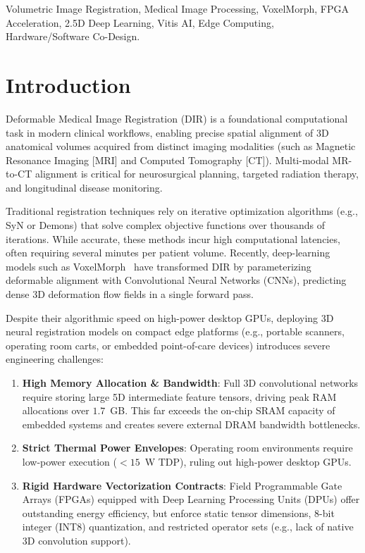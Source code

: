 \documentclass[conference]{IEEEtran}
\begin{document}
\begin{IEEEkeywords}
Volumetric Image Registration, Medical Image Processing, VoxelMorph, FPGA Acceleration, 2.5D Deep Learning, Vitis AI, Edge Computing, Hardware/Software Co-Design.
\end{IEEEkeywords}

\section{Introduction}
\label{sec:intro}

Deformable Medical Image Registration (DIR) is a foundational computational task in modern clinical workflows, enabling precise spatial alignment of 3D anatomical volumes acquired from distinct imaging modalities (such as Magnetic Resonance Imaging [MRI] and Computed Tomography [CT]). Multi-modal MR-to-CT alignment is critical for neurosurgical planning, targeted radiation therapy, and longitudinal disease monitoring.

Traditional registration techniques rely on iterative optimization algorithms (e.g., SyN or Demons) that solve complex objective functions over thousands of iterations. While accurate, these methods incur high computational latencies, often requiring several minutes per patient volume. Recently, deep-learning models such as VoxelMorph~\cite{balakrishnan2019voxelmorph} have transformed DIR by parameterizing deformable alignment with Convolutional Neural Networks (CNNs), predicting dense 3D deformation flow fields in a single forward pass.

Despite their algorithmic speed on high-power desktop GPUs, deploying 3D neural registration models on compact edge platforms (e.g., portable scanners, operating room carts, or embedded point-of-care devices) introduces severe engineering challenges:
\begin{enumerate}
    \item \textbf{High Memory Allocation \& Bandwidth}: Full 3D convolutional networks require storing large 5D intermediate feature tensors, driving peak RAM allocations over $1.7$~GB. This far exceeds the on-chip SRAM capacity of embedded systems and creates severe external DRAM bandwidth bottlenecks.
    \item \textbf{Strict Thermal Power Envelopes}: Operating room environments require low-power execution ($<15$~W TDP), ruling out high-power desktop GPUs.
    \item \textbf{Rigid Hardware Vectorization Contracts}: Field Programmable Gate Arrays (FPGAs) equipped with Deep Learning Processing Units (DPUs) offer outstanding energy efficiency, but enforce static tensor dimensions, 8-bit integer (INT8) quantization, and restricted operator sets (e.g., lack of native 3D convolution support).
\end{enumerate}
\end{document}
